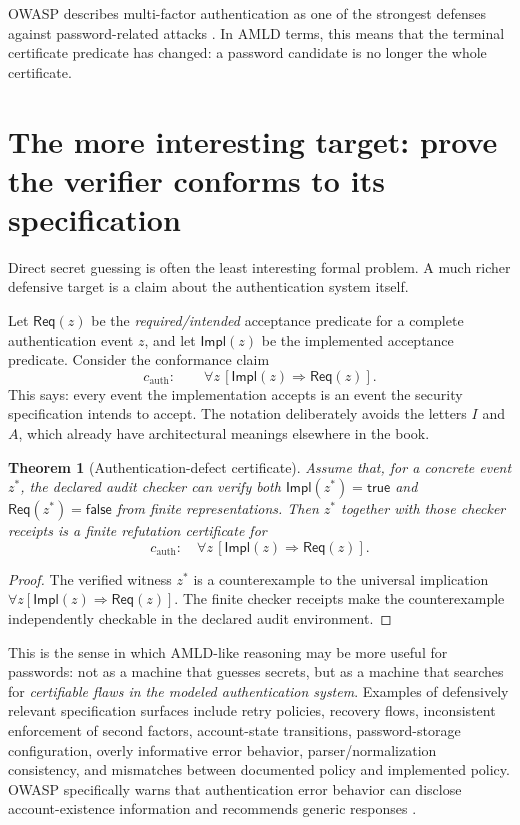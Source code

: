 \documentclass[11pt,openany]{book}
\newtheorem{theorem}{Theorem}[chapter]
\theoremstyle{definition}
\theoremstyle{remark}
\begin{document}
OWASP describes multi-factor authentication as one of the strongest defenses against password-related attacks \cite{OWASPAuth}. In AMLD terms, this means that the terminal certificate predicate has changed: a password candidate is no longer the whole certificate.

\section{The more interesting target: prove the verifier conforms to its specification}
Direct secret guessing is often the least interesting formal problem. A much richer defensive target is a claim about the authentication system itself.

Let $\mathsf{Req}(z)$ be the \emph{required/intended} acceptance predicate for a complete authentication event $z$, and let $\mathsf{Impl}(z)$ be the implemented acceptance predicate. Consider the conformance claim
\[
c_{\mathrm{auth}}:\qquad \forall z\,[\mathsf{Impl}(z)\Rightarrow \mathsf{Req}(z)].
\]
This says: every event the implementation accepts is an event the security specification intends to accept. The notation deliberately avoids the letters $I$ and $A$, which already have architectural meanings elsewhere in the book.

\begin{theorem}[Authentication-defect certificate]\label{thm:defectcert}
Assume that, for a concrete event $z^*$, the declared audit checker can verify both $\mathsf{Impl}(z^*)=\textsf{true}$ and $\mathsf{Req}(z^*)=\textsf{false}$ from finite representations. Then $z^*$ together with those checker receipts is a finite refutation certificate for
\[
c_{\mathrm{auth}}:\quad \forall z\,[\mathsf{Impl}(z)\Rightarrow \mathsf{Req}(z)].
\]
\end{theorem}
\begin{proof}
The verified witness $z^*$ is a counterexample to the universal implication $\forall z[\mathsf{Impl}(z)\Rightarrow \mathsf{Req}(z)]$. The finite checker receipts make the counterexample independently checkable in the declared audit environment.
\end{proof}

This is the sense in which AMLD-like reasoning may be more useful for passwords: not as a machine that guesses secrets, but as a machine that searches for \emph{certifiable flaws in the modeled authentication system}. Examples of defensively relevant specification surfaces include retry policies, recovery flows, inconsistent enforcement of second factors, account-state transitions, password-storage configuration, overly informative error behavior, parser/normalization consistency, and mismatches between documented policy and implemented policy. OWASP specifically warns that authentication error behavior can disclose account-existence information and recommends generic responses \cite{OWASPAuth}.
\end{document}
